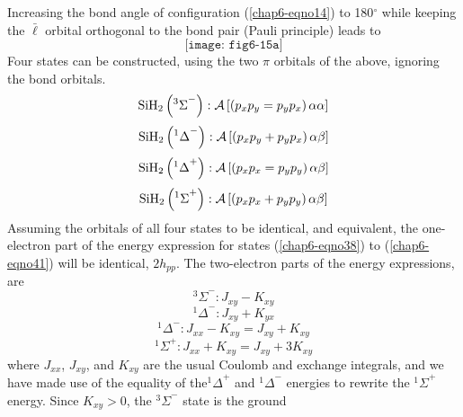 Increasing the bond angle of configuration (\ref{chap6-eqno14}) to
180$^{\circ}$ while keeping the ${\bar{\ell}}$ orbital orthogonal to
the bond pair (Pauli principle) leads to
\begin{equation}
\texttt{[image: fig6-15a]}
\end{equation}
Four states can be constructed, using the two $\pi$ orbitals of the 
above, ignoring the bond orbitals.
\begin{equation}
{\rm SiH}_2 \left( {^3\Sigma}^- \right) : {\cal A} \left[ \left( p_x 
p_y = p_y p_x \right) \alpha \alpha \right]
\label{chap6-eqno38}
\end{equation}
\begin{equation}
{\rm SiH}_2 \left( {^1\Delta}^- \right) : {\cal A} \left[ \left( p_x 
p_y + p_y p_x \right) \alpha \beta \right]
\label{chap6-eqno39}
\end{equation}
\begin{equation}
{\rm SiH}_2 \left( {^1\Delta}^+ \right) : {\cal A} \left[ \left( p_x 
p_x = p_y p_y \right) \alpha \beta \right]
\label{chap6-eqno40}
\end{equation}
\begin{equation}
{\rm SiH}_2 \left( {^1\Sigma}^+ \right) : {\cal A} \left[ \left( p_x 
p_x + p_y p_y \right) \alpha \beta \right]
\label{chap6-eqno41}
\end{equation}
Assuming the orbitals of all four states to be identical, and
equivalent, the one-electron part of the energy expression for states
(\ref{chap6-eqno38}) to (\ref{chap6-eqno41}) will be identical,
$2h_{pp}$.  The two-electron parts of the energy expressions, are
\begin{equation}
{^3\Sigma}^- : J_{xy} - K_{xy}
\label{chap6-eqno42}
\end{equation}
\begin{equation}
{^1\Delta}^- : J_{xy} + K_{yx}
\label{chap6-eqno43}
\end{equation}
\begin{equation}
{^1\Delta}^- : J_{xx} - K_{xy} = J_{xy} + K_{xy}
\label{chap6-eqno44}
\end{equation}
\begin{equation}
{^1\Sigma}^+ : J_{xx} + K_{xy} = J_{xy} + 3K_{xy}
\label{chap6-eqno45}
\end{equation}
where $J_{xx}$, $J_{xy}$, and $K_{xy}$ are the usual Coulomb and exchange 
integrals, and
we have made use of the equality of the${^1\Delta}^+$ and 
${^1\Delta}^-$  energies to rewrite the ${^1\Sigma}^+$ 
energy. Since $K_{xy} > 0$, the ${^3\Sigma}^-$ state is the ground 
